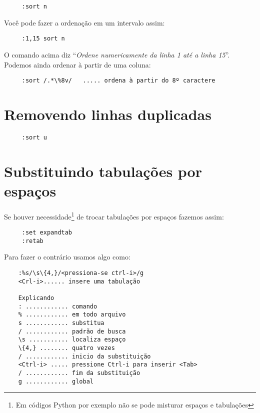 \begin{verbatim}
     :sort n
\end{verbatim}

Você pode fazer a ordenação em um intervalo assim:

\begin{verbatim}
     :1,15 sort n
\end{verbatim}

O comando acima diz ``{\em Ordene numericamente da linha 1 até a linha 15}''.  
Podemos ainda ordenar à partir de uma coluna:

\begin{verbatim}
     :sort /.*\%8v/   ..... ordena à partir do 8º caractere
\end{verbatim}

\section{Removendo linhas duplicadas}

\begin{verbatim}
     :sort u
\end{verbatim}

\section{Substituindo tabulações por espaços}
\label{sec:Substituindo tabulações por espaços}

Se houver necessidade\footnote{Em códigos Python por exemplo não se pode
misturar espaços e tabulações} de trocar tabulações por espaços
fazemos assim:

\begin{verbatim}
	 :set expandtab
	 :retab
\end{verbatim}

Para fazer o contrário usamos algo como:

\begin{verbatim}
    :%s/\s\{4,}/<pressiona-se ctrl-i>/g
    <Crl-i>...... insere uma tabulação

    Explicando
    : ............ comando
    % ............ em todo arquivo 
    s ............ substitua 
    / ............ padrão de busca
    \s ........... localiza espaço
    \{4,} ........ quatro vezes
    / ............ inicio da substituição
    <Ctrl-i> ..... pressione Ctrl-i para inserir <Tab>
    / ............ fim da substituição
    g ............ global

\end{verbatim}


